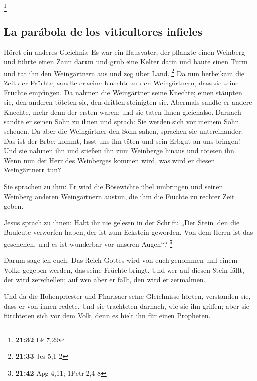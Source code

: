 \footnote{\textbf{21:32} Lk 7,29}

\hypertarget{la-paruxe1bola-de-los-viticultores-infieles}{%
\subsection{La parábola de los viticultores
infieles}\label{la-paruxe1bola-de-los-viticultores-infieles}}

 Höret ein anderes Gleichnis: Es war ein Hausvater, der
pflanzte einen Weinberg und führte einen Zaun darum und grub eine Kelter
darin und baute einen Turm und tat ihn den Weingärtnern aus und zog über
Land. \footnote{\textbf{21:33} Jes 5,1-2}  Da nun
herbeikam die Zeit der Früchte, sandte er seine Knechte zu den
Weingärtnern, dass sie seine Früchte empfingen.  Da
nahmen die Weingärtner seine Knechte; einen stäupten sie, den anderen
töteten sie, den dritten steinigten sie.  Abermals sandte
er andere Knechte, mehr denn der ersten waren; und sie taten ihnen
gleichalso.  Darnach sandte er seinen Sohn zu ihnen und
sprach: Sie werden sich vor meinem Sohn scheuen.  Da aber
die Weingärtner den Sohn sahen, sprachen sie untereinander: Das ist der
Erbe; kommt, lasst uns ihn töten und sein Erbgut an uns bringen!
 Und sie nahmen ihn und stießen ihn zum Weinberge hinaus
und töteten ihn.  Wenn nun der Herr des Weinberges kommen
wird, was wird er diesen Weingärtnern tun?

 Sie sprachen zu ihm: Er wird die Bösewichte übel
umbringen und seinen Weinberg anderen Weingärtnern austun, die ihm die
Früchte zu rechter Zeit geben.

 Jesus sprach zu ihnen: Habt ihr nie gelesen in der
Schrift: „Der Stein, den die Bauleute verworfen haben, der ist zum
Eckstein geworden. Von dem Herrn ist das geschehen, und es ist wunderbar
vor unseren Augen``? \footnote{\textbf{21:42} Apg 4,11; 1Petr 2,4-8}

 Darum sage ich euch: Das Reich Gottes wird von euch
genommen und einem Volke gegeben werden, das seine Früchte bringt.
 Und wer auf diesen Stein fällt, der wird zerschellen;
auf wen aber er fällt, den wird er zermalmen.

 Und da die Hohenpriester und Pharisäer seine Gleichnisse
hörten, verstanden sie, dass er von ihnen redete.  Und
sie trachteten darnach, wie sie ihn griffen; aber sie fürchteten sich
vor dem Volk, denn es hielt ihn für einen Propheten.

